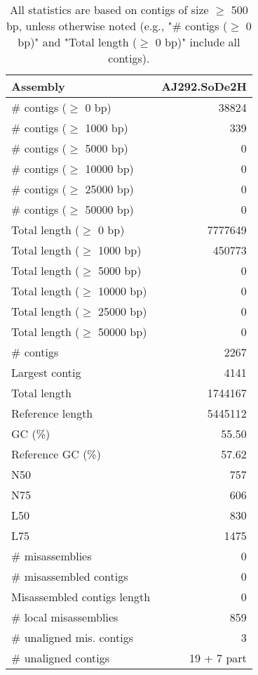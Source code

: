 \documentclass[12pt,a4paper]{article}
\begin{document}
\begin{table}[ht]
\begin{center}
\caption{All statistics are based on contigs of size $\geq$ 500 bp, unless otherwise noted (e.g., "\# contigs ($\geq$ 0 bp)" and "Total length ($\geq$ 0 bp)" include all contigs).}
\begin{tabular}{|l*{1}{|r}|}
\hline
Assembly & AJ292.SoDe2H \\ \hline
\# contigs ($\geq$ 0 bp) & 38824 \\ \hline
\# contigs ($\geq$ 1000 bp) & 339 \\ \hline
\# contigs ($\geq$ 5000 bp) & 0 \\ \hline
\# contigs ($\geq$ 10000 bp) & 0 \\ \hline
\# contigs ($\geq$ 25000 bp) & 0 \\ \hline
\# contigs ($\geq$ 50000 bp) & 0 \\ \hline
Total length ($\geq$ 0 bp) & 7777649 \\ \hline
Total length ($\geq$ 1000 bp) & 450773 \\ \hline
Total length ($\geq$ 5000 bp) & 0 \\ \hline
Total length ($\geq$ 10000 bp) & 0 \\ \hline
Total length ($\geq$ 25000 bp) & 0 \\ \hline
Total length ($\geq$ 50000 bp) & 0 \\ \hline
\# contigs & 2267 \\ \hline
Largest contig & 4141 \\ \hline
Total length & 1744167 \\ \hline
Reference length & 5445112 \\ \hline
GC (\%) & 55.50 \\ \hline
Reference GC (\%) & 57.62 \\ \hline
N50 & 757 \\ \hline
N75 & 606 \\ \hline
L50 & 830 \\ \hline
L75 & 1475 \\ \hline
\# misassemblies & 0 \\ \hline
\# misassembled contigs & 0 \\ \hline
Misassembled contigs length & 0 \\ \hline
\# local misassemblies & 859 \\ \hline
\# unaligned mis. contigs & 3 \\ \hline
\# unaligned contigs & 19 + 7 part \\ \hline

\end{tabular}
\end{center}
\end{table}
\end{document}
